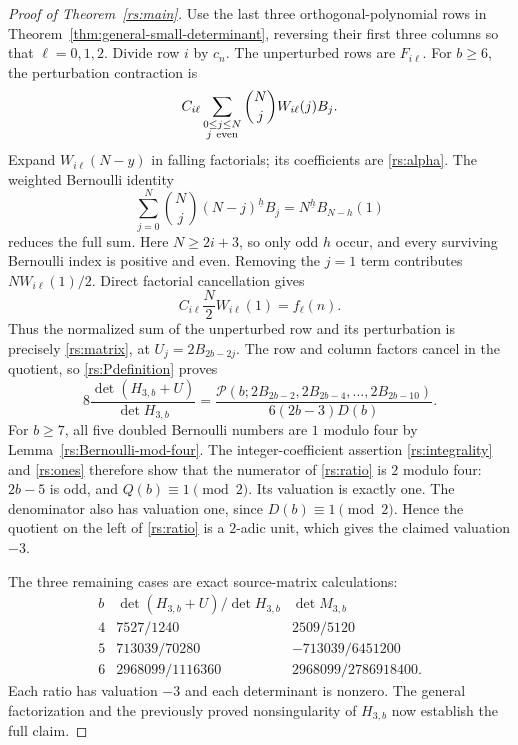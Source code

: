 \begin{proof}[Proof of Theorem~\ref{rs:main}]
Use the last three orthogonal-polynomial rows in
Theorem~\ref{thm:general-small-determinant}, reversing their first
three columns so that $\ell=0,1,2$. Divide row $i$ by $c_n$.
The unperturbed rows are $F_{i\ell}$.
For $b\ge6$, the perturbation contraction is
\[
 C_{i\ell}\sum_{\substack{0\le j\le N\\j\ {\rm even}}}
          \binom Nj W_{i\ell}(j)B_j.
\]
Expand $W_{i\ell}(N-y)$ in falling factorials; its coefficients
are \eqref{rs:alpha}. The weighted Bernoulli identity
\[
 \sum_{j=0}^N\binom Nj (N-j)^{\underline h}B_j
       =N^{\underline h}B_{N-h}(1)
\]
reduces the full sum. Here $N\ge2i+3$, so only odd $h$ occur,
and every surviving Bernoulli index is positive and even.
Removing the $j=1$ term contributes $NW_{i\ell}(1)/2$.
Direct factorial cancellation gives
\[
 C_{i\ell}\frac N2W_{i\ell}(1)=f_\ell(n).
\]
Thus the normalized sum of the unperturbed row and its perturbation
is precisely \eqref{rs:matrix}, at
$U_j=2B_{2b-2j}$. The row and column factors cancel in the quotient,
so \eqref{rs:Pdefinition} proves
\begin{equation}\label{rs:ratio}
 8\frac{\det(H_{3,b}+U)}{\det H_{3,b}}
 =\frac{\mathscr P(b;2B_{2b-2},2B_{2b-4},\ldots,2B_{2b-10})}
             {6(2b-3)D(b)}.
\end{equation}
For $b\ge7$, all five doubled Bernoulli numbers are $1$ modulo
four by Lemma~\ref{rs:Bernoulli-mod-four}.
The integer-coefficient assertion \eqref{rs:integrality} and
\eqref{rs:ones} therefore show that the numerator of
\eqref{rs:ratio} is $2$ modulo four: $2b-5$ is odd, and
$Q(b)\equiv1\pmod2$. Its valuation is exactly one.
The denominator also has valuation one, since
$D(b)\equiv1\pmod2$. Hence the quotient on the left of
\eqref{rs:ratio} is a $2$-adic unit, which gives the claimed
valuation $-3$.

The three remaining cases are exact source-matrix calculations:
\[
\begin{array}{c|c|c}
 b&\det(H_{3,b}+U)/\det H_{3,b}&\det M_{3,b}\\\hline
 4&7527/1240&2509/5120\\
 5&713039/70280&-713039/6451200\\
 6&2968099/1116360&2968099/2786918400.
\end{array}
\]
Each ratio has valuation $-3$ and each determinant is nonzero.
The general factorization and the previously proved nonsingularity
of $H_{3,b}$ now establish the full claim.
\end{proof}

